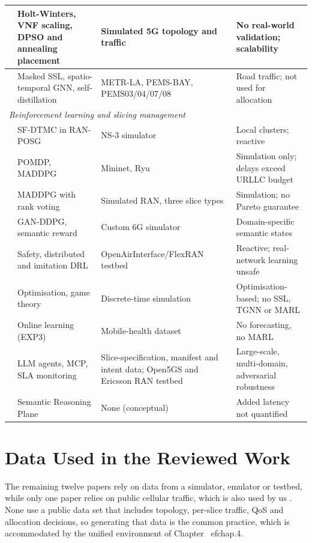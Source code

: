 {\begin{longtable}{|p{0.9cm}|>{\raggedright\arraybackslash}p{4.8cm}|>{\raggedright\arraybackslash}p{4.7cm}|>{\raggedright\arraybackslash}p{4.5cm}|}
\cite{holtwinters2020} & Holt-Winters, VNF scaling, DPSO and annealing placement & Simulated 5G topology and traffic & No real-world validation; scalability \\ \hline
\cite{ssgnn2023} & Masked SSL, spatio-temporal GNN, self-distillation & METR-LA, PEMS-BAY, PEMS03/04/07/08 & Road traffic; not used for allocation \\ \hline
\multicolumn{4}{|l|}{\textit{Reinforcement learning and slicing management}} \\ \hline
\cite{li2026} & SF-DTMC in RAN-POSG & NS-3 simulator & Local clusters; reactive \\ \hline
\cite{vehicularmarl2023} & POMDP, MADDPG & Mininet, Ryu & Simulation only; delays exceed URLLC budget \\ \hline
\cite{imaddpg2023} & MADDPG with rank voting & Simulated RAN, three slice types & Simulation; no Pareto guarantee \\ \hline
\cite{john2026} & GAN-DDPG, semantic reward & Custom 6G simulator & Domain-specific semantic states \\ \hline
\cite{drle2e2023} & Safety, distributed and imitation DRL & OpenAirInterface/FlexRAN testbed & Reactive; real-network learning unsafe \\ \hline
\cite{slicemobility2022} & Optimisation, game theory & Discrete-time simulation & Optimisation-based; no SSL, TGNN or MARL \\ \hline
\cite{slicingforai2025} & Online learning (EXP3) & Mobile-health dataset & No forecasting, no MARL \\ \hline
\cite{agentic2026} & LLM agents, MCP, SLA monitoring & Slice-specification, manifest and intent data; Open5GS and Ericsson RAN testbed & Large-scale, multi-domain, adversarial robustness \\ \hline
\cite{chowdhury2025} & Semantic Reasoning Plane & None (conceptual) & Added latency not quantified \\ \hline
\end{longtable}
}


\section{Data Used in the Reviewed Work}
The remaining twelve papers rely on data from a simulator, emulator or testbed, while only one paper relies on public cellular traffic, which is also used by us \cite{selfopt2026}. None use a public data set that includes topology, per-slice traffic, QoS and allocation decisions, so generating that data is the common practice, which is accommodated by the unified environment of Chapter~
ef{chap.4}.

